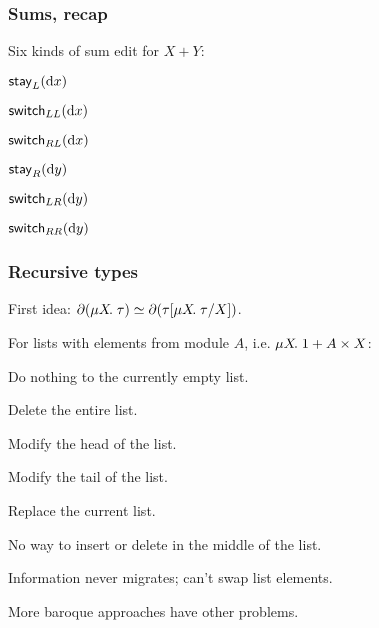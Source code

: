 \documentclass[table]{beamer}
\begin{document}
\begin{frame}
    \frametitle{Sums, recap}
    Six kinds of sum edit for $X + Y$:
    \begin{center}
        $\mathsf{stay}_L(\textrm{d} x)$

        $\mathsf{switch}_{LL}(\textrm{d} x)$

        $\mathsf{switch}_{RL}(\textrm{d} x)$

        \vspace{2ex}

        $\mathsf{stay}_R(\textrm{d} y)$

        $\mathsf{switch}_{LR}(\textrm{d} y)$

        $\mathsf{switch}_{RR}(\textrm{d} y)$
    \end{center}
\end{frame}


\begin{frame}
    \frametitle{Recursive types}
    First idea: $\partial(\mu X\!.\;\tau)\simeq\partial(\tau[\mu X\!.\;\tau/X])$.

    For lists with elements from module $A$, i.e. $\mu X\!.\;1+A \times X$:

    \begin{description}[$\mlstayr{\mlright\dx}$]
        \item[$\mlstayl\anything$] Do nothing to the currently empty list.
        \item[$\mlswitch_{\anything L}(\anything)$] Delete the entire list.
        \item[$\mlstayr{\mlleft{\d a}}$] Modify the head of the list.
        \item[$\mlstayr{\mlright\dx}$] Modify the tail of the list.
        \item[$\mlswitch_{\anything R}(\anything)$] Replace the current
            list.
    \end{description}

    \alert{No way to insert or delete in the middle of the list.}

    Information never migrates; can't swap list elements.

    \pause

    More baroque approaches have other problems.
\end{frame}
\end{document}
